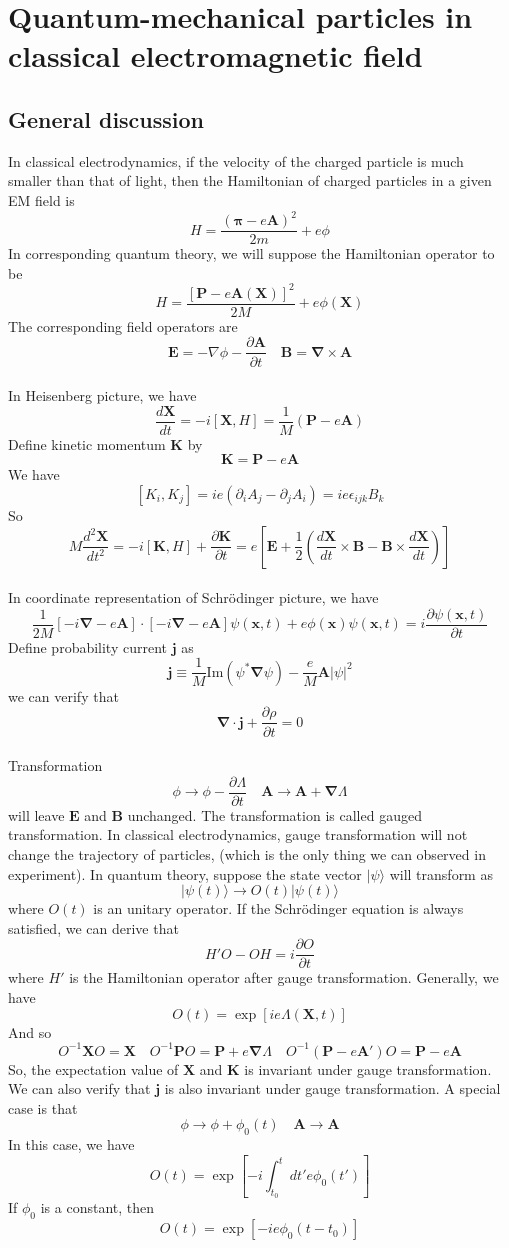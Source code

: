 \section{Quantum-mechanical particles in classical electromagnetic field}
\subsection{General discussion}
In classical electrodynamics, if the velocity of the charged particle is much smaller than that of light, then the Hamiltonian of charged particles in a given EM field is
\[H = \frac{(\bm{\pi}-e\bm{A})^2}{2m} + e\phi\]
In corresponding quantum theory, we will suppose the Hamiltonian operator to be
\[H = \frac{[\bm{P}-e\bm{A}(\bm{X})]^2}{2M} + e\phi(\bm{X})\]
The corresponding field operators are
\[\bm{E} = -\nabla\phi - \frac{\partial \bm{A}}{\partial t} \quad \bm{B} = \bm{\nabla}\times\bm{A}\]\\
In Heisenberg picture, we have
\[\frac{d\bm{X}}{dt} = -i[\bm{X},H] = \frac{1}{M}(\bm{P}-e\bm{A})\]
Define kinetic momentum $\bm{K}$ by
\[\bm{K} = \bm{P}-e\bm{A}\]
We have
\[[K_i,K_j] = ie(\partial_i A_j-\partial_j A_i) = ie\epsilon_{ijk}B_k\]
So
\[M \frac{d^2\bm{X}}{dt^2} = -i[\bm{K},H] + \frac{\partial \bm{K}}{\partial t} = e \left[ \bm{E}+ \frac{1}{2} \left( \frac{d\bm{X}}{dt} \times \bm{B} - \bm{B}\times\frac{d\bm{X}}{dt} \right) \right]\]\\
In coordinate representation of Schrödinger picture, we have
\[\frac{1}{2M} \left[ -i\bm{\nabla}-e\bm{A} \right] \cdot \left[ -i\bm{\nabla}-e\bm{A} \right] \psi(\bm{x},t) + e\phi(\bm{x})\psi(\bm{x},t) = i \frac{\partial \psi(\bm{x},t)}{\partial t}\]
Define probability current $\bm{j}$ as
\[\bm{j} \equiv \frac{1}{M} \mathrm{Im}(\psi^{*}\bm{\nabla}\psi) - \frac{e}{M}\bm{A}|\psi|^2\]
we can verify that
\[\bm{\nabla}\cdot\bm{j} + \frac{\partial \rho}{\partial t} = 0\]\\
Transformation
\[\phi \to \phi - \frac{\partial \Lambda}{\partial t} \quad \bm{A} \to \bm{A} + \bm{\nabla}\Lambda\]
will leave $\bm{E}$ and $\bm{B}$ unchanged. The transformation is called gauged transformation. In classical electrodynamics, gauge transformation will not change the trajectory of particles, (which is the only thing we can observed in experiment). In quantum theory, suppose the state vector $|\psi\rangle$ will transform as 
\[|\psi(t)\rangle \to O(t)|\psi(t)\rangle\]
where $O(t)$ is an unitary operator. If the Schrödinger equation is always satisfied, we can derive that
\[H'O - OH = i\frac{\partial O}{\partial t}\]
where $H'$ is the Hamiltonian operator after gauge transformation. Generally, we have
\[O(t) = \exp \left[ ie\Lambda(\bm{X},t)\right]\]
And so
\[O^{-1} \bm{X} O = \bm{X} \quad O^{-1} \bm{P} O = \bm{P} + e\bm{\nabla}\Lambda \quad O^{-1}(\bm{P}-e\bm{A}')O = \bm{P} - e\bm{A}\]
So, the expectation value of $\bm{X}$ and $\bm{K}$ is invariant under gauge transformation. We can also verify that $\bm{j}$ is also invariant under gauge transformation.
A special case is that
\[\phi \to \phi+\phi_0(t) \quad \bm{A} \to \bm{A}\]
In this case, we have
\[O(t) = \exp \left[ -i \int_{t_0}^{t} dt' e\phi_0(t') \right]\]
If $\phi_0$ is a constant, then
\[O(t) = \exp \left[ -ie\phi_0(t-t_0) \right]\]

